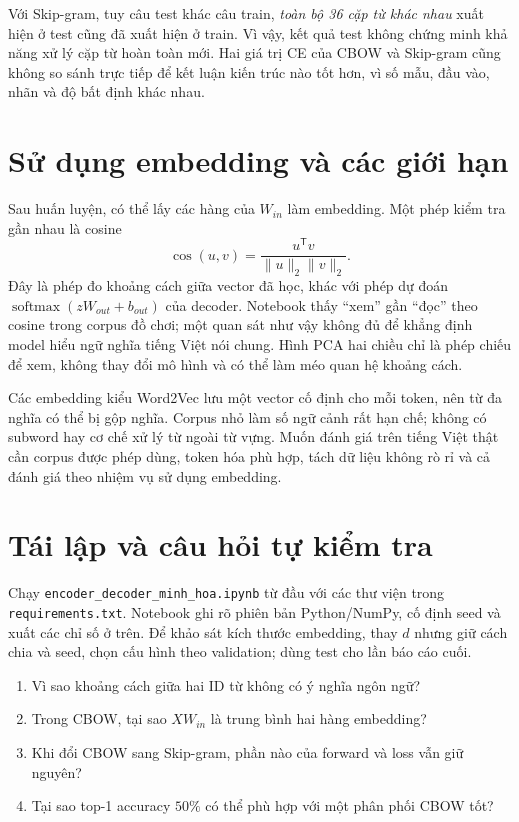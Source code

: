 \documentclass[12pt,a4paper]{article}
\begin{document}
Với Skip-gram, tuy câu test khác câu train, \emph{toàn bộ 36 cặp từ khác nhau} xuất hiện ở test cũng đã xuất hiện ở train. Vì vậy, kết quả test không chứng minh khả năng xử lý cặp từ hoàn toàn mới. Hai giá trị CE của CBOW và Skip-gram cũng không so sánh trực tiếp để kết luận kiến trúc nào tốt hơn, vì số mẫu, đầu vào, nhãn và độ bất định khác nhau.

\section{Sử dụng embedding và các giới hạn}
Sau huấn luyện, có thể lấy các hàng của $W_{in}$ làm embedding. Một phép kiểm tra gần nhau là cosine
\begin{equation}
\operatorname{cos}(u,v)=\frac{u^{\mathsf T}v}{\|u\|_2\|v\|_2}.
\end{equation}
Đây là phép đo khoảng cách giữa vector đã học, khác với phép dự đoán $\operatorname{softmax}(zW_{out}+b_{out})$ của decoder. Notebook thấy ``xem'' gần ``đọc'' theo cosine trong corpus đồ chơi; một quan sát như vậy không đủ để khẳng định model hiểu ngữ nghĩa tiếng Việt nói chung. Hình PCA hai chiều chỉ là phép chiếu để xem, không thay đổi mô hình và có thể làm méo quan hệ khoảng cách.

Các embedding kiểu Word2Vec lưu một vector cố định cho mỗi token, nên từ đa nghĩa có thể bị gộp nghĩa. Corpus nhỏ làm số ngữ cảnh rất hạn chế; không có subword hay cơ chế xử lý từ ngoài từ vựng. Muốn đánh giá trên tiếng Việt thật cần corpus được phép dùng, token hóa phù hợp, tách dữ liệu không rò rỉ và cả đánh giá theo nhiệm vụ sử dụng embedding.

\section{Tái lập và câu hỏi tự kiểm tra}
Chạy \texttt{encoder\_decoder\_minh\_hoa.ipynb} từ đầu với các thư viện trong \texttt{requirements.txt}. Notebook ghi rõ phiên bản Python/NumPy, cố định seed và xuất các chỉ số ở trên. Để khảo sát kích thước embedding, thay $d$ nhưng giữ cách chia và seed, chọn cấu hình theo validation; dùng test cho lần báo cáo cuối.

\begin{enumerate}[leftmargin=*]
\item Vì sao khoảng cách giữa hai ID từ không có ý nghĩa ngôn ngữ?
\item Trong CBOW, tại sao $XW_{in}$ là trung bình hai hàng embedding?
\item Khi đổi CBOW sang Skip-gram, phần nào của forward và loss vẫn giữ nguyên?
\item Tại sao top-1 accuracy $50\%$ có thể phù hợp với một phân phối CBOW tốt?
\end{enumerate}
\end{document}
